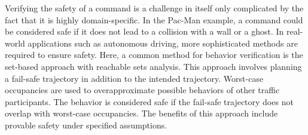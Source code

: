 Verifying the safety of a command is a challenge in itself only complicated by the fact that it is highly domain-specific.
In the Pac-Man example, a command could be considered safe if it does not lead to a collision with a wall or a ghost.
In real-world applications such as autonomous driving, more sophisticated methods are required to ensure safety.
Here, a common method for behavior verification is the set-based approach with reachable sets analysis.
This approach involves planning a fail-safe trajectory in addition to the intended trajectory.
Worst-case occupancies are used to overapproximate possible behaviors of other traffic participants.
The behavior is considered safe if the fail-safe trajectory does not overlap with worst-case occupancies.
The benefits of this approach include provable safety under specified assumptions.

